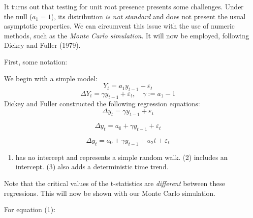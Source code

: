 \documentclass[
]{article}
\providecommand{\tightlist}{%
  \setlength{\itemsep}{0pt}\setlength{\parskip}{0pt}}
\begin{document}
It turns out that testing for unit root presence presents some
challenges. Under the null (\(a_1 = 1\)), its distribution \emph{is not
standard} and does not present the usual asymptotic properties. We can
circumvent this issue with the use of numeric methods, such as the
\emph{Monte Carlo simulation}. It will now be employed, following Dickey
and Fuller (1979).

First, some notation:

We begin with a simple model: \[ Y_t = a_1 y_{t-1} + \varepsilon_t \]
\[ \Delta Y_t = \gamma y_{t-1} + \varepsilon_t, \hspace{1em} \gamma := a_1 - 1 \]
Dickey and Fuller constructed the following regression equations:
\begin{equation}
 \Delta y_t = \gamma y_{t-1} + \varepsilon_t
\end{equation}

\begin{equation}
\Delta y_t = a_0 + \gamma y_{t-1} + \varepsilon_t
\end{equation}

\begin{equation}
\Delta y_t = a_0 + \gamma y_{t-1} + a_2t + \varepsilon_t
\end{equation}

\begin{enumerate}
\def\labelenumi{(\arabic{enumi})}
\tightlist
\item
  has no intercept and represents a simple random walk. (2) includes an
  intercept. (3) also adds a deterministic time trend.
\end{enumerate}

Note that the critical values of the t-statistics are \emph{different}
between these regressions. This will now be shown with our Monte Carlo
simulation.

For equation (1):
\end{document}
